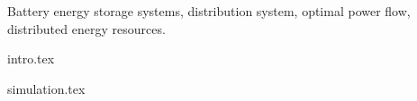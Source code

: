 \documentclass[conference]{IEEEtran} %
\begin{document}
\begin{abstract}

\end{abstract}

\begin{IEEEkeywords}
Battery energy storage systems, distribution system, optimal power flow, distributed energy resources.
\end{IEEEkeywords}

{intro.tex}



{simulation.tex}









\end{document}
